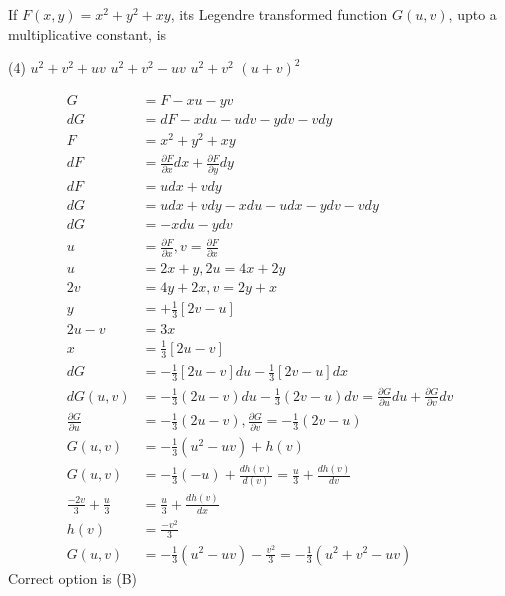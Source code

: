 \begin{questions}
\begin{minipage}{\textwidth}
	\question If $F(x, y)=x^{2}+y^{2}+x y$, its Legendre transformed function $G(u, v)$, upto a multiplicative constant, is
\end{minipage}
\begin{tasks}(4)
	\task[\textbf{A.}] $u^{2}+v^{2}+u v$
	\task[\textbf{B.}] $u^{2}+v^{2}-u v$
	\task[\textbf{C.}]$u^{2}+v^{2}$
	\task[\textbf{D.}]$(u+v)^{2}$
\end{tasks}
\begin{answer}
	\begin{align*}
	G&=F-x u-y v\\
	d G&=d F-x d u-u d v-y d v-v d y\\
	F&=x^{2}+y^{2}+x y\\
	d F&=\frac{\partial F}{\partial x} d x+\frac{\partial F}{\partial y} d y\\
	d F&=u d x+v d y\\
	d G&=u d x+v d y-x d u-u d x-y d v-v d y\\
	d G&=-x d u-y d v\\
	u&=\frac{\partial F}{\partial x}, v=\frac{\partial F}{\partial x}\\
	u&=2 x+y, 2 u=4 x+2 y\\
	2 v&=4 y+2 x, v=2 y+x\\
	y&=+\frac{1}{3}[2 v-u]\\
	2 u-v&=3 x\\
	x&=\frac{1}{3}[2 u-v]\\
	d G&=-\frac{1}{3}[2 u-v] d u-\frac{1}{3}[2 v-u] d x\\
	d G(u, v)&=-\frac{1}{3}(2 u-v) d u-\frac{1}{3}(2 v-u) d v=\frac{\partial G}{\partial u} d u+\frac{\partial G}{\partial v} d v\\
	\frac{\partial G}{\partial u}&=-\frac{1}{3}(2 u-v), \frac{\partial G}{\partial v}=-\frac{1}{3}(2 v-u)\\
	G(u, v)&=-\frac{1}{3}\left(u^{2}-u v\right)+h(v)\\
	G(u, v)&=-\frac{1}{3}(-u)+\frac{d h(v)}{d(v)}=\frac{u}{3}+\frac{d h(v)}{d v}\\
	\frac{-2 v}{3}+\frac{u}{3}&=\frac{u}{3}+\frac{d h(v)}{d x}\\
	h(v)&=\frac{-v^{2}}{3}\\
	G(u, v)&=-\frac{1}{3}\left(u^{2}-u v\right)-\frac{v^{2}}{3}=-\frac{1}{3}\left(u^{2}+v^{2}-u v\right)
	\end{align*}
	Correct option is (B)
\end{answer}
\begin{minipage}{\textwidth}

\end{minipage}
\end{questions}
